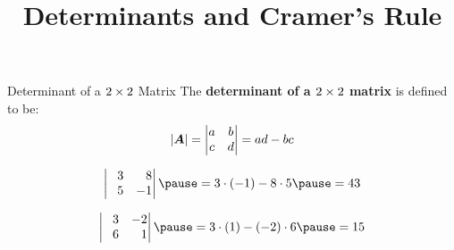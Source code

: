 \documentclass{beamer}
\title[MATH 1080 - Section 10.6]{Determinants and Cramer's Rule}
\begin{document}
\begin{frame}
  \titlepage
\end{frame}

\begin{frame}
\begin{block}{Determinant of a $2 \times 2$ Matrix}
The \textbf{determinant of a $2 \times 2$ matrix} is defined to be:
\begin{equation*}
{\left\lvert \boldsymbol{A}\right\rvert} = 
\begin{vmatrix}
a & b \\
c & d
\end{vmatrix}
=ad-bc
\end{equation*}
\end{block}\pause
\begin{example}
\begin{equation*}
\begin{vmatrix}
\+3 & \+8\\
\+5 & -1
\end{vmatrix}\pause
=3\cdot (-1) - 8\cdot 5\pause
=43
\end{equation*}
\end{example}\pause
\begin{example}
\begin{equation*}
\begin{vmatrix}
\+3 &  -2\\
\+6 & \+1
\end{vmatrix}\pause
=3\cdot (1) - (-2)\cdot 6\pause
=15
\end{equation*}
\end{example}
\end{frame}
\end{document}
